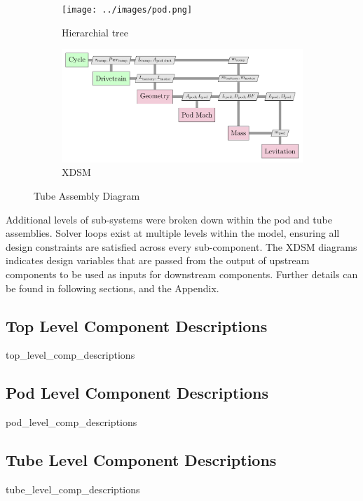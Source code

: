 \begin{figure}
\centering
\begin{subfigure}{.5\textwidth}
  \centering
  \texttt{[image: ../images/pod.png]}
  \caption{Hierarchial tree}
  \label{fig:tree:pod}
\end{subfigure}%
\begin{subfigure}{.5\textwidth}
  \centering
  \includegraphics{../images/xdsm/pod.pdf}
  \caption{XDSM}
  \label{fig:xdsm:pod}
\end{subfigure}
\caption{Tube Assembly Diagram}
\label{fig:pod}
\end{figure}

Additional levels of sub-systems were broken down within the pod and tube assemblies.
Solver loops exist at multiple levels within the model, ensuring all design
constraints are satisfied across every sub-component.
The XDSM diagrams indicates design variables that are passed from the output of
upstream components to be used as inputs for downstream components.
Further details can be found in following sections, and the Appendix.

\subsection{Top Level Component Descriptions}
	{top_level_comp_descriptions}
\subsection{Pod Level Component Descriptions}
	{pod_level_comp_descriptions}
\subsection{Tube Level Component Descriptions}
	{tube_level_comp_descriptions}


